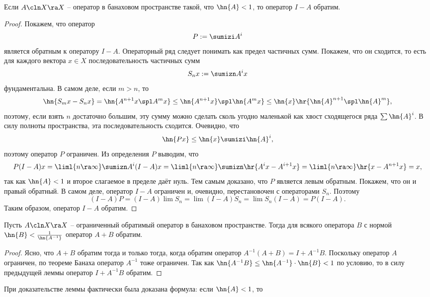 \documentclass[a4paper]{article}
\begin{document}
\begin{lemma}
Если $A\cln X \ra X$ -- оператор в банаховом пространстве такой, что $\hn{A} < 1$, то оператор $I - A$ обратим.
\end{lemma}
\begin{proof}
Покажем, что оператор
$$P := \sumizi A^i$$
является обратным к оператору $I - A$. Операторный ряд следует понимать как предел частичных сумм.
Покажем, что он сходится, то есть для каждого вектора $x \in X$
последовательность частичных сумм
$$
  S_n x := \sumizn A^ix
$$
фундаментальна.
В самом деле, если $m>n$, то
$$
  \hn{S_m x - S_n x} = \hn{A^{n+1}x\spl A^m x} \le \hn{A^{n+1}x}\spl \hn{A^m x}\le
  \hn{x} \hr{\hn{A}^{n+1}\spl \hn{A}^m},
$$
поэтому, если взять $n$ достаточно большим, эту сумму можно сделать сколь угодно маленькой
как хвост сходящегося ряда $\sum\hn{A}^i$.
В силу полноты пространства, эта последовательность сходится. Очевидно, что
$$\hn{Px} \le \hn{x} \sumizi \hn{A}^i,$$
поэтому оператор $P$ ограничен.
Из определения $P$ выводим, что
$$P(I-A)x = \liml{n \ra \infty} \sumizn A^i(I-A)x = \liml{n\ra\infty}\sumizn\hr{A^ix - A^{i+1}x}
= \liml{n\ra\infty} \hr{x-A^{n+1}x} = x,$$
так как $\hn{A}<1$ и второе слагаемое в пределе даёт нуль. Тем самым доказано, что
$P$ является левым обратным. Покажем, что он и правый обратный.
В самом деле, оператор $I-A$ ограничен и, очевидно, перестановочен с операторами $S_n$.
Поэтому
$$(I - A)P = (I-A)\lim S_n = \lim (I-A)S_n = \lim S_n(I-A) = P(I-A).$$
Таким образом, оператор $I-A$ обратим.
\end{proof}

\begin{theorem}
\label{th:resolveness.under.small.pert}
Пусть $A\cln X \ra X$ -- ограниченный обратимый оператор в банаховом пространстве. Тогда
для всякого оператора $B$ с нормой $\hn{B} < \frac{1}{\hn{A^{-1}}}$ оператор $A + B$ обратим.
\end{theorem}
\begin{proof}
Ясно, что $A+B$ обратим тогда и только тогда, когда обратим оператор $A^{-1}(A+B) = I + A^{-1}B$.
Поскольку оператор $A$ ограничен, по теореме Банаха оператор $A^{-1}$ тоже ограничен.
Так как $\hn{A^{-1}B} \le \hn{A^{-1}} \cdot \hn{B} < 1$ по условию, то в силу предыдущей леммы
оператор $I + A^{-1}B$ обратим.
\end{proof}

При доказательстве леммы фактически была доказана формула: если $\hn{A} < 1$, то
\end{document}
